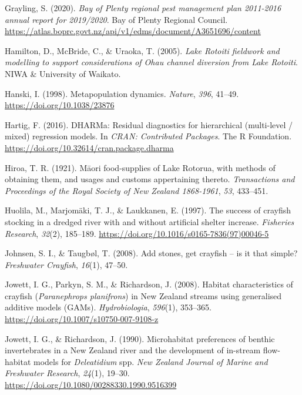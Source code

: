 \documentclass[
  letterpaper,
  DIV=11,
  numbers=noendperiod]{scrartcl}
\newlength{\cslhangindent}
\newenvironment{CSLReferences}[2] %
 {\begin{list}{}{%
  \setlength{\itemindent}{0pt}
  \setlength{\leftmargin}{0pt}
  \setlength{\parsep}{0pt}
  \ifodd #1
   \setlength{\leftmargin}{\cslhangindent}
   \setlength{\itemindent}{-1\cslhangindent}
  \fi
  \setlength{\itemsep}{#2\baselineskip}}}
 {\end{list}}
\begin{document}
\begin{CSLReferences}{1}{0}
Grayling, S. (2020). \emph{{Bay of Plenty} regional pest management plan
2011-2016 annual report for 2019/2020}. Bay of Plenty Regional Council.
\url{https://atlas.boprc.govt.nz/api/v1/edms/document/A3651696/content}

Hamilton, D., McBride, C., \& Uraoka, T. (2005). \emph{{Lake Rotoiti}
fieldwork and modelling to support considerations of {Ohau} channel
diversion from {Lake Rotoiti}}. NIWA \& University of Waikato.

Hanski, I. (1998). Metapopulation dynamics. \emph{Nature}, \emph{396},
41--49. \url{https://doi.org/10.1038/23876}

Hartig, F. (2016). {DHARMa}: Residual diagnostics for hierarchical
(multi-level / mixed) regression models. In \emph{CRAN: Contributed
Packages}. The R Foundation.
\url{https://doi.org/10.32614/cran.package.dharma}

Hiroa, T. R. (1921). M{ā}ori food-supplies of {Lake Rotorua}, with
methods of obtaining them, and usages and customs appertaining thereto.
\emph{Transactions and Proceedings of the Royal Society of New Zealand
1868-1961}, \emph{53}, 433--451.

Huolila, M., Marjomäki, T. J., \& Laukkanen, E. (1997). The success of
crayfish stocking in a dredged river with and without artificial shelter
increase. \emph{Fisheries Research}, \emph{32}(2), 185--189.
\url{https://doi.org/10.1016/s0165-7836(97)00046-5}

Johnsen, S. I., \& Taugbøl, T. (2008). Add stones, get crayfish -- is it
that simple? \emph{Freshwater Crayfish}, \emph{16}(1), 47--50.

Jowett, I. G., Parkyn, S. M., \& Richardson, J. (2008). Habitat
characteristics of crayfish ({\emph{Paranephrops planifrons}}) in {New
Zealand} streams using generalised additive models ({GAMs}).
\emph{Hydrobiologia}, \emph{596}(1), 353--365.
\url{https://doi.org/10.1007/s10750-007-9108-z}

Jowett, I. G., \& Richardson, J. (1990). Microhabitat preferences of
benthic invertebrates in a {New Zealand} river and the development of
in-stream flow-habitat models for {\emph{Deleatidium}} spp. \emph{New
Zealand Journal of Marine and Freshwater Research}, \emph{24}(1),
19--30. \url{https://doi.org/10.1080/00288330.1990.9516399}


\end{CSLReferences}
\end{document}
